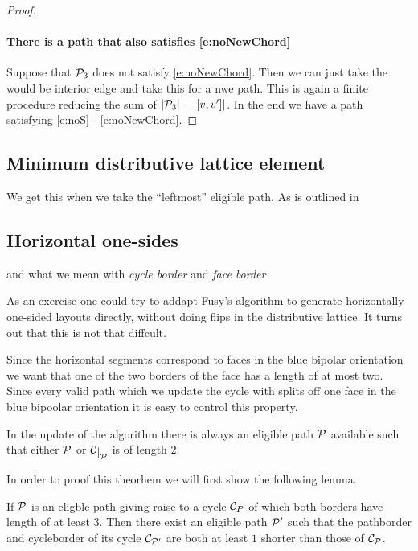 \begin{proof}

\paragraph{There is a path that also satisfies \ref{e:noNewChord}}
Suppose that $\P_3$ does not satisfy \ref{e:noNewChord}. Then we can just take the would be interior edge and take this for a nwe path. This is again a finite procedure reducing the sum of $|\P_3| -|[v,v']|$. In the end we have a path satisfying \ref{e:noS} - \ref{e:noNewChord}.



\end{proof}

\subsection{Minimum distributive lattice element}
\label{ss:minimal}
We get this when we take the ``leftmost'' eligible path. As is outlined in \cite{Fusy2006}

\renewcommand{\F}{\scr F}
\subsection{Horizontal one-sides}
\label{ss:blue}
\note and what we mean with \emph{cycle border} and \emph{face border}

As an exercise one could try to addapt Fusy's algorithm to generate horizontally one-sided layouts directly, without doing flips in the distributive lattice. It turns out that this is not that diffcult.

Since the horizontal segments correspond to faces in the blue bipolar orientation we want that one of the two borders of the face has a length of at most two. Since every valid path which we update the cycle with splits off one face in the blue bipoolar orientation it is easy to control this property.

\begin{thrm}
\label{th:blueelig}
In the update of the algorithm there is always an eligible path $\P$ available such that either $\P$ or $\restC{\P}$ is of length $2$.
\end{thrm}

In order to proof this theorhem we will first show the following lemma.

\begin{lemma}
\label{lem:bluealgo}
If $\P$ is an eligble path giving raise to a cycle $\C_P$ of which both borders have length of at least $3$. Then there exist an eligible path $\P'$ such that the pathborder and cycleborder of its cycle $\C_{\P'}$ are both at least $1$ shorter than those of $\C_\P$.
\end{lemma}

